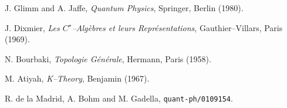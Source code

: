 \documentclass[a4paper,a4paper]{article}
\begin{document}
\begin{thebibliography}{99}
J. Glimm and A. Jaffe, {\it Quantum Physics}, Springer, Berlin (1980).

J. Dixmier, {\it Les $C^{\star}$--Alg\`ebres et leurs Repr\'esentations}, 
Gauthier--Villars, Paris (1969).

N. Bourbaki, {\it Topologie G\'en\'erale}, Hermann, Paris (1958).

M. Atiyah, {\it K--Theory}, Benjamin (1967).

R. de la Madrid, A. Bohm and M. Gadella, {\tt quant-ph/0109154}.




\end{thebibliography}
\end{document}
